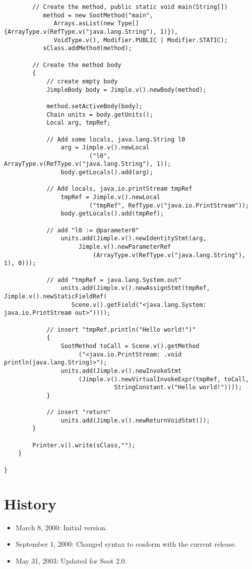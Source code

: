 \documentclass{article}
\begin{document}
\begin{verbatim}
        // Create the method, public static void main(String[])
           method = new SootMethod("main",
              Arrays.asList(new Type[] {ArrayType.v(RefType.v("java.lang.String"), 1)}),
              VoidType.v(), Modifier.PUBLIC | Modifier.STATIC);
           sClass.addMethod(method);
           
        // Create the method body
        {
            // create empty body
            JimpleBody body = Jimple.v().newBody(method);
            
            method.setActiveBody(body);
            Chain units = body.getUnits();
            Local arg, tmpRef;
            
            // Add some locals, java.lang.String l0
                arg = Jimple.v().newLocal
                        ("l0", ArrayType.v(RefType.v("java.lang.String"), 1));
                body.getLocals().add(arg);
            
            // Add locals, java.io.printStream tmpRef
                tmpRef = Jimple.v().newLocal
                        ("tmpRef", RefType.v("java.io.PrintStream"));
                body.getLocals().add(tmpRef);
                
            // add "l0 := @parameter0"
                units.add(Jimple.v().newIdentityStmt(arg, 
                     Jimple.v().newParameterRef
                         (ArrayType.v(RefType.v("java.lang.String"), 1), 0)));
            
            // add "tmpRef = java.lang.System.out"
                units.add(Jimple.v().newAssignStmt(tmpRef, Jimple.v().newStaticFieldRef(
                   Scene.v().getField("<java.lang.System: java.io.PrintStream out>"))));
            
            // insert "tmpRef.println("Hello world!")"
            {
                SootMethod toCall = Scene.v().getMethod
                     ("<java.io.PrintStream: .void println(java.lang.String)>");
                units.add(Jimple.v().newInvokeStmt
                     (Jimple.v().newVirtualInvokeExpr(tmpRef, toCall, 
                               StringConstant.v("Hello world!"))));
            }                        
            
            // insert "return"
                units.add(Jimple.v().newReturnVoidStmt());
        }

        Printer.v().write(sClass,"");
    }
        
}
\end{verbatim}

\section{History}
\begin{itemize}
\item March 8, 2000: Initial version.
\item September 1, 2000: Changed syntax to conform with the current release.
\item May 31, 2003: Updated for Soot 2.0.
\end{itemize}
\end{document}
